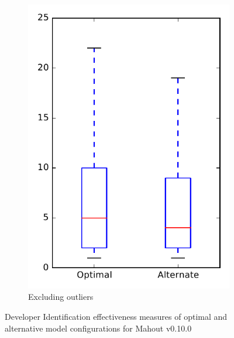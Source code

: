 \begin{figure}
\begin{subfigure}{.4\textwidth}
        \includegraphics[height=0.4\textheight]{figures/combo/dit_rq1_mahout_no_outlier}
        \caption{Excluding outliers}\label{fig:combo:dit:rq1:mahout_no_outlier}
    \end{subfigure}
\caption{Developer Identification effectiveness measures of optimal and alternative model configurations for Mahout v0.10.0}
\label{fig:combo:dit:rq1:mahout}
\end{figure}

